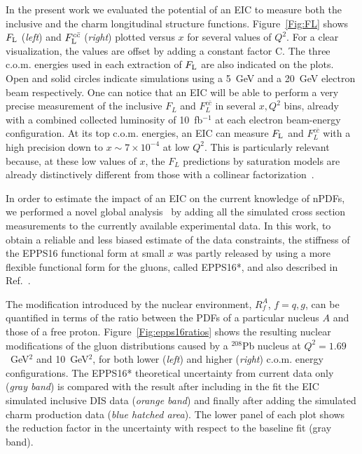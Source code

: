 \documentclass{PoS}
\begin{document}
In the present work we evaluated the potential of an EIC to measure both the inclusive and the charm longitudinal structure functions. Figure~\ref{Fig:FL} shows $F_{\rm L}$ ({\em left}) and 
$F_{\rm L}^{c\bar{c}}$ ({\em right}) plotted versus $x$ for several values of $Q^{2}$. For a clear visualization, the values are offset by adding a constant factor C.
The three c.o.m. energies used in each extraction of $F_{\rm L}$ are also indicated on the plots. Open and solid circles indicate simulations using a 5~GeV and a 20~GeV electron beam respectively.
One can notice that an EIC will be able to perform a very precise measurement of the inclusive $F_{L}$ and $F_{L}^{c\bar{c}}$ in several $x, Q^{2}$ bins, already with a combined collected luminosity of 10~fb$^{-1}$ at each electron beam-energy configuration. 
At its top c.o.m. energies, an EIC can measure $F_{\rm L}$ and $F_{L}^{c\bar{c}}$ with a high precision down to $x \sim 7 \times 10^{-4}$ at low $Q^2$. This is particularly relevant because, at these low values of $x$, the $F_{L}$ predictions by saturation models are already distinctively different from those with a collinear factorization~\cite{Marquet:2017bga}.

In order to estimate the impact of an EIC on the current knowledge of nPDFs, we performed a novel global analysis~\cite{Aschenauer:2017oxs} by adding all the simulated cross section measurements to the currently available experimental data. In this work, to obtain a reliable and less biased estimate of the data constraints, the stiffness of the EPPS16 functional form at small $x$ was partly released by using a more flexible functional form for the gluons, called EPPS16*, and also described in Ref.~\cite{Aschenauer:2017oxs}.  


The modification introduced by the nuclear environment, $R_f^A$, $f=q,g$, can be quantified in terms of the ratio between the PDFs of a particular nucleus $A$ and those of a free proton. Figure~\ref{Fig:epps16ratios} shows the resulting nuclear modifications of the gluon distributions caused by a $^{208}$Pb nucleus at $Q^{2} = 1.69$~GeV$^2$ and 10~GeV$^2$, for both lower ({\it left}) and higher ({\it right}) c.o.m. energy configurations.
The EPPS16* theoretical uncertainty from current data only ({\it gray band}) is compared with the result after including in the fit the EIC simulated inclusive DIS data ({\it orange band}) and finally after adding the simulated charm production data ({\it blue hatched area}).
The lower panel of each plot shows the reduction factor in the uncertainty with respect to the baseline fit (gray band). 
\end{document}
